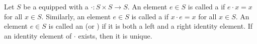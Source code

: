 \begin{definition} \label{definition:left_right_identity_element_of_a_binary_operation_on_a_set}
Let $S$ be a  equipped with a  $\cdot : S \times S \to S$. An element $e \in S$ is called a  if $e \cdot x = x$ for all $x \in S$. Similarly, an element $e \in S$ is called a  if $x \cdot e = x$ for all $x \in S$. An element $e \in S$ is called an  (or ) if it is both a left and a right identity element. 
If an identity element of $\cdot$ exists, then it is unique.
\end{definition}